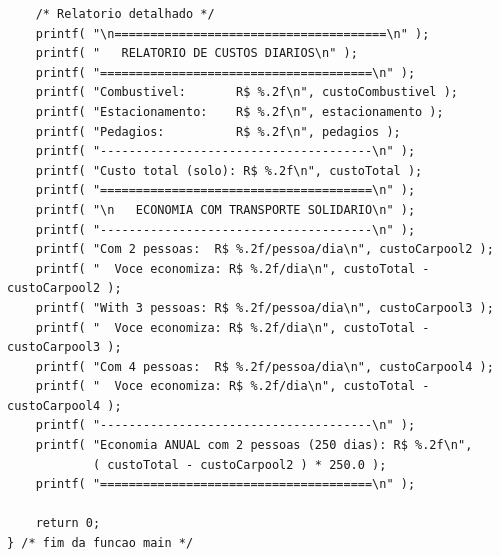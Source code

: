 \documentclass[12pt,a4paper]{article}
\begin{document}
\begin{respostabox}
\begin{lstlisting}
    /* Relatorio detalhado */
    printf( "\n======================================\n" );
    printf( "   RELATORIO DE CUSTOS DIARIOS\n" );
    printf( "======================================\n" );
    printf( "Combustivel:       R$ %.2f\n", custoCombustivel );
    printf( "Estacionamento:    R$ %.2f\n", estacionamento );
    printf( "Pedagios:          R$ %.2f\n", pedagios );
    printf( "--------------------------------------\n" );
    printf( "Custo total (solo): R$ %.2f\n", custoTotal );
    printf( "======================================\n" );
    printf( "\n   ECONOMIA COM TRANSPORTE SOLIDARIO\n" );
    printf( "--------------------------------------\n" );
    printf( "Com 2 pessoas:  R$ %.2f/pessoa/dia\n", custoCarpool2 );
    printf( "  Voce economiza: R$ %.2f/dia\n", custoTotal - custoCarpool2 );
    printf( "With 3 pessoas: R$ %.2f/pessoa/dia\n", custoCarpool3 );
    printf( "  Voce economiza: R$ %.2f/dia\n", custoTotal - custoCarpool3 );
    printf( "Com 4 pessoas:  R$ %.2f/pessoa/dia\n", custoCarpool4 );
    printf( "  Voce economiza: R$ %.2f/dia\n", custoTotal - custoCarpool4 );
    printf( "--------------------------------------\n" );
    printf( "Economia ANUAL com 2 pessoas (250 dias): R$ %.2f\n",
            ( custoTotal - custoCarpool2 ) * 250.0 );
    printf( "======================================\n" );

    return 0;
} /* fim da funcao main */
\end{lstlisting}


\end{respostabox}
\end{document}
